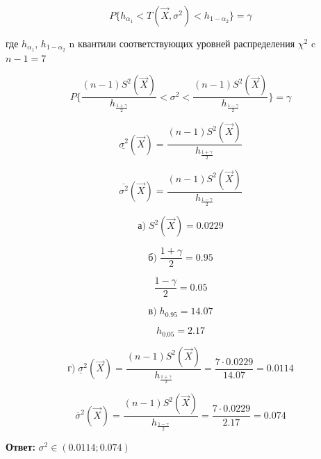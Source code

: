 \documentclass[12pt, a4paper]{report}
\begin{document}
	 \begin{equation*}
	 P \{   h_{\alpha_1} < T(\vec{X}, \sigma^2) < h_{1 - \alpha_2}  \} = \gamma
	 \end{equation*}
	 
	 где $h_{\alpha_1}$, $h_{1 - \alpha_2}$ n квантили соответствующих уровней распределения $\chi^2$ c $n-1=7$
	 
	 \begin{equation*}
	 P \{    \frac{  (n-1) S^2(\vec{X})  }{h_{  \frac{1+\gamma}{2}}} < \sigma^2 < \frac{   (n-1)S^2(\vec{X})    }{ h_{\frac{1-\gamma}{2}}      }    \} = \gamma
	 \end{equation*}
	 
	 \begin{equation*}
	 \underline{\sigma^2}(\vec{X}) = \frac{(n-1)S^2(\vec{X})}{h_{\frac{1+\gamma}{2}}}
	 \end{equation*}
	 
	 \begin{equation*}
	 \overline{\sigma^2}(\vec{X}) = \frac{(n-1)S^2(\vec{X})}{h_{\frac{1-\gamma}{2}}}
	 \end{equation*}
	  
	  \begin{equation*}
	  \textbf{а)}\; S^2(\vec{X}) = 0.0229
	  \end{equation*}
	  
	  \begin{equation*}
	  \textbf{б)}\; \frac{1+\gamma}{2} = 0.95
	  \end{equation*}
	  
	  \begin{equation*}
	  \frac{1-\gamma}{2} = 0.05
	  \end{equation*}
	  
	  \begin{equation*}
	  \textbf{в)}\; h_{0.95} = 14.07
	  \end{equation*}
	  
	  \begin{equation*}
	  h_{0.05} = 2.17
	  \end{equation*}
	  
	  \begin{equation*}
	  \textbf{г)}\; \underline{\sigma}^2(\vec{X}) = \frac{  (n-1) S^2(\vec{X})}{  h_{\frac{1+\gamma}{2}}  } = \frac{7 \cdot 0.0229}{14.07} = 0.0114
	  \end{equation*}
	  
	  \begin{equation*}
	  \overline{\sigma}^2(\vec{X}) = \frac{  (n-1) S^2(\vec{X})}{  h_{\frac{1-\gamma}{2}}  } = \frac{7 \cdot 0.0229}{2.17} = 0.074
	  \end{equation*}
	
	\vspace{0.5cm}
	\textbf{Ответ:} $\sigma^2 \in (0.0114; 0.074)$
	
	
	
\end{document}
